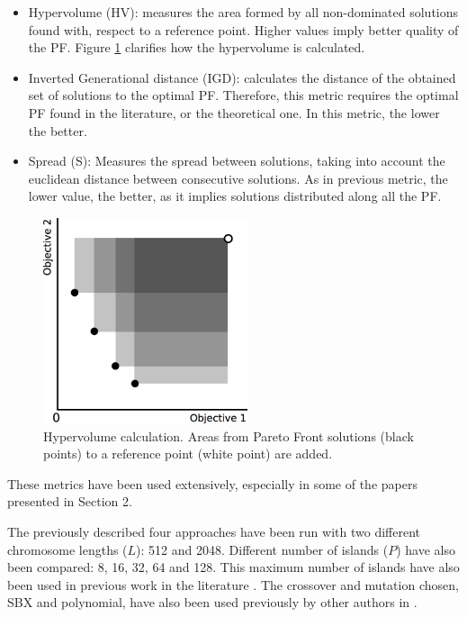 \documentclass[preprint]{elsarticle}
\begin{document}
\begin{itemize}
\item Hypervolume (HV): measures the area formed by all non-dominated solutions found with, respect to a reference point. Higher values imply better quality of the PF. Figure \ref{fig:hypervolume} clarifies how the hypervolume is calculated.
\item Inverted Generational distance (IGD): calculates the distance of the obtained set of solutions to the optimal PF. Therefore, this metric requires the optimal PF found in the literature, or the theoretical one. In this metric, the lower the better. %
\item Spread (S): Measures the spread between solutions, taking into account the euclidean distance between consecutive solutions. As in previous metric, the lower value, the better, as it implies solutions distributed along all the PF.
\end{itemize}

\begin{figure}
\centering
\includegraphics[width=6cm]{hypervolume.jpg}
\caption{Hypervolume calculation. Areas from Pareto Front solutions (black points) to a reference point (white point) are added.}
\label{fig:hypervolume}
\end{figure}


These metrics have been used extensively, especially in some of the papers presented in Section 2.



The previously described four approaches have been run with two different chromosome lengths ($L$): 512 and 2048. Different number of islands ($P$) have also been compared: 8, 16, 32, 64 and 128. This maximum number of islands have also been  used in previous work in the literature \citep{Martens13asynchronous}. The crossover and mutation chosen, SBX and polynomial, have also been  used previously by other authors in \citep{Durillo08masterslave}. 
\end{document}
